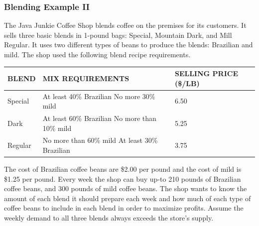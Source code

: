 \documentclass{beamer}
\begin{document}
\begin{frame}[shrink]
\frametitle{Blending Example II}
The Java Junkie Coffee Shop blends coffee on the 
premises for its customers.  It sells three basic blends in 
1-pound bags:  Special, Mountain Dark, and Mill 
Regular.  It uses two different types of beans to 
produce the blends: Brazilian and mild.  The shop used 
the following blend recipe requirements.

{\small\begin{center}
\begin{tabular}{|p{30pt}|p{200pt}|p{40pt}|}
\hline
BLEND & MIX REQUIREMENTS & SELLING PRICE (\$/LB) \\
\hline
Special & At least 40\% Brazilian No more 30\% mild & 6.50 \\
Dark & At least 60\% Brazilian No more than 10\% mild & 5.25 \\
Regular & No more than 60\% mild At least 30\% Brazilian & 3.75 \\
\hline
\end{tabular}
\end{center}}

The cost of Brazilian coffee beans are \$2.00 per pound 
and the cost of mild is \$1.25 per pound. Every week the 
shop can buy up-to 210 pounds of Brazilian coffee 
beans, and 300 pounds of mild coffee beans.  The 
shop wants to know the amount of each blend it 
should prepare each week and how much of each 
type of coffee beans to include in each blend in order 
to maximize profits. Assume the weekly demand to all 
three blends always exceeds the store’s supply.
\end{frame}
\end{document}
